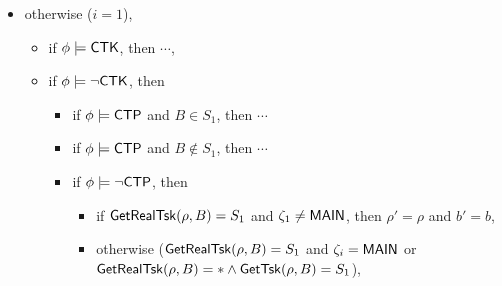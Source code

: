 {\begin{itemize}
\begin{itemize}
\begin{itemize}
\begin{itemize}
\begin{itemize}
\begin{itemize}
\begin{itemize}
\begin{itemize}
                                    \item otherwise, $\rho' = \rmact(\mvtsktop(\rho, i), 2, 1)$, 
                                \end{itemize}
                                \item otherwise, $b' = \nohflag$ iff $\phi \models \nohflag$, moreover, 
                                \begin{itemize}
                                    \item if $b = \neg \nohflag$, then $\rho'=\push(\mvtsktop(\rho, i), B)$,
                                    \item otherwise, $\rho' = \rmact(\push(\mvtsktop(\rho, i), B), 2, 1)$, 
                                \end{itemize}
                        \end{itemize}
                    \end{itemize}
                \end{itemize}
        \end{itemize}
    \item otherwise ($i  = 1$),  
    \begin{itemize}
        \item if $\phi \models {\sf CTK}$, then $\cdots$, 
        \item if $\phi \models \neg {\sf CTK}$, then 
        \begin{itemize}
            \item if $\phi \models {\sf CTP}$ and $B \in S_1$, then $\cdots$
            \item if $\phi \models {\sf CTP}$ and $B\notin S_1$, then $\cdots$
            \item if $\phi \models \neg {\sf CTP}$, then
            \begin{itemize}
                \item if $\mathsf{GetRealTsk}(\rho,B) = S_1$ and $\zeta_1 \neq {\sf MAIN}$, then $\rho' = \rho$ and $b' = b$,
                \item otherwise ($\mathsf{GetRealTsk}(\rho,B) = S_1$ and $\zeta_i = {\sf MAIN}$ or $\mathsf{GetRealTsk}(\rho,B) = * \wedge\mathsf{GetTsk}(\rho,B) = S_1$), 
                \begin{itemize}

\end{itemize}
\end{itemize}
\end{itemize}
\end{itemize}
\end{itemize}
\end{itemize}
\end{itemize}}
